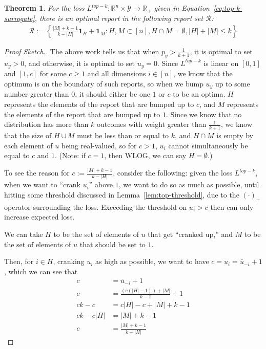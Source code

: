 \documentclass[12pt]{article}
\newcommand{\reals}{\mathbb{R}}
\newcommand{\R}{\mathcal{R}}
\newcommand{\Y}{\mathcal{Y}}
\newtheorem{theorem}{Theorem}
\begin{document}
\begin{theorem}
	For the loss $L^{top-k} : \reals^n \times \Y \to \reals_+$ given in Equation~\ref{eq:top-k-surrogate}, there is an optimal report in the following report set $\R$:
	\begin{align*}
	\R := \left\{ \frac{|M| + k -1}{k - |H|} \mathbf{1}_H + \mathbf{1}_M : H, M \subset [n], H\cap M = \emptyset, |H| + |M| \leq k \right\}
	\end{align*}
\end{theorem}
\begin{proof}[Proof Sketch.]
	The above work tells us that when $p_y > \frac 1 {k+1}$, it is optimal to set $u_y > 0$, and otherwise, it is optimal to set $u_y = 0$.
	Since $L^{top-k}$ is linear on $[0,1]$ and $[1, c]$ for some $c \geq 1$ and all dimensions $i \in [n]$, we know that the optimum is on the boundary of such reports, so when we bump $u_y$ up to some number greater than $0$, it should either be one $1$ or $c$ to be an optima.
	$H$ represents the elements of the report that are bumped up to $c$, and $M$ represents the elements of the report that are bumped up to $1$.
	Since we know that no distribution has more than $k$ outcomes with weight greater than $\frac 1 {k+1}$, we know that the size of $H \cup M$ must be less than or equal to $k$, and $H \cap M$ is empty by each element of $u$ being real-valued, so for $c > 1$, $u_i$ cannot simultaneously be equal to $c$ and $1$.
	(Note: if $c = 1$, then WLOG, we can say $H = \emptyset$.)
	
	To see the reason for $c := \frac{|M| + k -1}{k - |H|}$, consider the following: given the loss $L^{top-k}$, when we want to ``crank $u_i$'' above $1$, we want to do so as much as possible, until hitting some threshold discussed in Lemma~\ref{lem:top-threshold}, due to the $(\cdot)_+$ operator surrounding the loss.
	Exceeding the threshold on $u_i > c$ then can only increase expected loss.
	
	We can take $H$ to be the set of elements of $u$ that get ``cranked up,'' and $M$ to be the set of elements of $u$ that should be set to $1$.
	
	Then, for $i \in H$, cranking $u_i$ as high as possible, we want to have $c = u_i = \bar u _{-i} + 1$, which we can see that 
	\begin{align*}
	c &= \bar u_{-i} + 1 \\
	c &= \frac{(c (|H|-1)) + |M|}{k-1} + 1\\
	ck-c &= c|H| - c + |M| + k - 1\\
	ck - c|H| &= |M| + k - 1\\
	c &= \frac{|M|+k-1}{k-|H|}
	\end{align*}
\end{proof}
\end{document}
